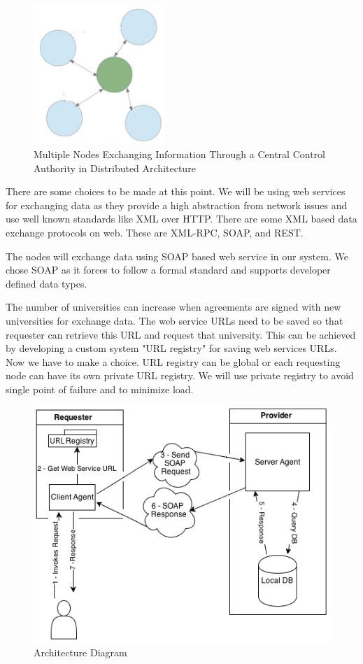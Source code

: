 \documentclass[12pt,a4paper,oneside]{book}
\begin{document}
\begin{figure}[!htp]
  \centering
  \includegraphics[width=5cm]{architecture_distributed_exchange_through_hec.png}
  \caption{Multiple Nodes Exchanging Information Through a Central Control Authority in Distributed Architecture}
  \label{fig:architecture_distributed_exchange_through_hec}
\end{figure}

There are some choices to be made at this point. We will be using web services for exchanging data as they provide a high abstraction from network issues and use well known standards like XML over HTTP. There are some XML based data exchange protocols on web. These are XML-RPC, SOAP, and REST.

The nodes will exchange data using SOAP based web service in our system.  We chose SOAP as it forces to follow a formal standard and supports developer defined data types.

The number of universities can increase when agreements are signed with new universities for exchange data. The web service URLs need to be saved so that requester can retrieve this URL and request that university. This can be achieved by developing a custom system "URL registry" for saving web services URLs. Now we have to make a choice. URL registry can be global or each requesting node can have its own private URL registry. We will use private registry to avoid single point of failure and to minimize load.

\begin{figure}[!htp]
  \centering
  \includegraphics[width=12cm]{architecture.png}
  \caption{Architecture Diagram}
  \label{fig:architecture}
\end{figure}
\end{document}

